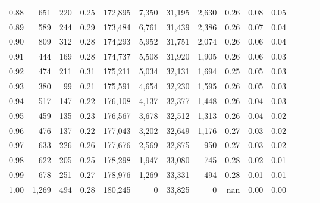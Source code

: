 \begin{tabular}{rrrrrrrrrrrrrr}
0.88 &     651 &    220 &  0.25 &  172,895 &    7,350 &  31,195 &   2,630 &  0.26 &  0.08 &      0.05 \\
0.89 &     589 &    244 &  0.29 &  173,484 &    6,761 &  31,439 &   2,386 &  0.26 &  0.07 &      0.04 \\
0.90 &     809 &    312 &  0.28 &  174,293 &    5,952 &  31,751 &   2,074 &  0.26 &  0.06 &      0.04 \\
0.91 &     444 &    169 &  0.28 &  174,737 &    5,508 &  31,920 &   1,905 &  0.26 &  0.06 &      0.03 \\
0.92 &     474 &    211 &  0.31 &  175,211 &    5,034 &  32,131 &   1,694 &  0.25 &  0.05 &      0.03 \\
0.93 &     380 &     99 &  0.21 &  175,591 &    4,654 &  32,230 &   1,595 &  0.26 &  0.05 &      0.03 \\
0.94 &     517 &    147 &  0.22 &  176,108 &    4,137 &  32,377 &   1,448 &  0.26 &  0.04 &      0.03 \\
0.95 &     459 &    135 &  0.23 &  176,567 &    3,678 &  32,512 &   1,313 &  0.26 &  0.04 &      0.02 \\
0.96 &     476 &    137 &  0.22 &  177,043 &    3,202 &  32,649 &   1,176 &  0.27 &  0.03 &      0.02 \\
0.97 &     633 &    226 &  0.26 &  177,676 &    2,569 &  32,875 &     950 &  0.27 &  0.03 &      0.02 \\
0.98 &     622 &    205 &  0.25 &  178,298 &    1,947 &  33,080 &     745 &  0.28 &  0.02 &      0.01 \\
0.99 &     678 &    251 &  0.27 &  178,976 &    1,269 &  33,331 &     494 &  0.28 &  0.01 &      0.01 \\
1.00 &   1,269 &    494 &  0.28 &  180,245 &        0 &  33,825 &       0 &   nan &  0.00 &      0.00 \\
\bottomrule
\end{tabular}
